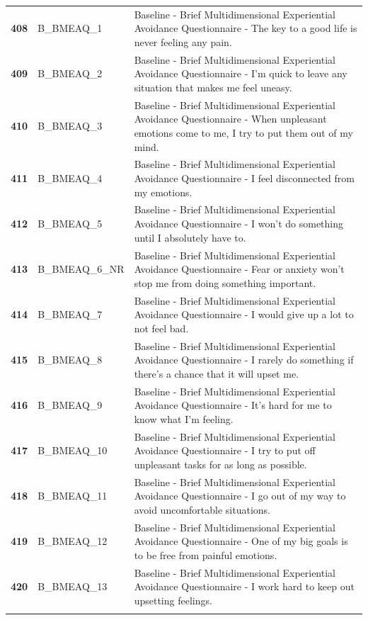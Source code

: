 \documentclass[
  letterpaper,
  DIV=11,
  numbers=noendperiod]{scrartcl}
\begin{document}
\begin{longtable}[t]{>{}cll}
\textbf{408} & B\_BMEAQ\_1 & Baseline - Brief Multidimensional Experiential Avoidance Questionnaire - The key to a good life is never feeling any pain.\\
\textbf{409} & B\_BMEAQ\_2 & Baseline - Brief Multidimensional Experiential Avoidance Questionnaire - I’m quick to leave any situation that makes me feel uneasy.\\
\textbf{410} & B\_BMEAQ\_3 & Baseline - Brief Multidimensional Experiential Avoidance Questionnaire - When unpleasant emotions come to me, I try to put them out of my mind.\\
\addlinespace
\textbf{411} & B\_BMEAQ\_4 & Baseline - Brief Multidimensional Experiential Avoidance Questionnaire - I feel disconnected from my emotions.\\
\textbf{412} & B\_BMEAQ\_5 & Baseline - Brief Multidimensional Experiential Avoidance Questionnaire - I won’t do something until I absolutely have to.\\
\textbf{413} & B\_BMEAQ\_6\_NR & Baseline - Brief Multidimensional Experiential Avoidance Questionnaire - Fear or anxiety won’t stop me from doing something important.\\
\textbf{414} & B\_BMEAQ\_7 & Baseline - Brief Multidimensional Experiential Avoidance Questionnaire - I would give up a lot to not feel bad.\\
\textbf{415} & B\_BMEAQ\_8 & Baseline - Brief Multidimensional Experiential Avoidance Questionnaire - I rarely do something if there’s a chance that it will upset me.\\
\addlinespace
\textbf{416} & B\_BMEAQ\_9 & Baseline - Brief Multidimensional Experiential Avoidance Questionnaire - It’s hard for me to know what I’m feeling.\\
\textbf{417} & B\_BMEAQ\_10 & Baseline - Brief Multidimensional Experiential Avoidance Questionnaire - I try to put off unpleasant tasks for as long as possible.\\
\textbf{418} & B\_BMEAQ\_11 & Baseline - Brief Multidimensional Experiential Avoidance Questionnaire - I go out of my way to avoid uncomfortable situations.\\
\textbf{419} & B\_BMEAQ\_12 & Baseline - Brief Multidimensional Experiential Avoidance Questionnaire - One of my big goals is to be free from painful emotions.\\
\textbf{420} & B\_BMEAQ\_13 & Baseline - Brief Multidimensional Experiential Avoidance Questionnaire - I work hard to keep out upsetting feelings.\\
\addlinespace

\end{longtable}
\end{document}
